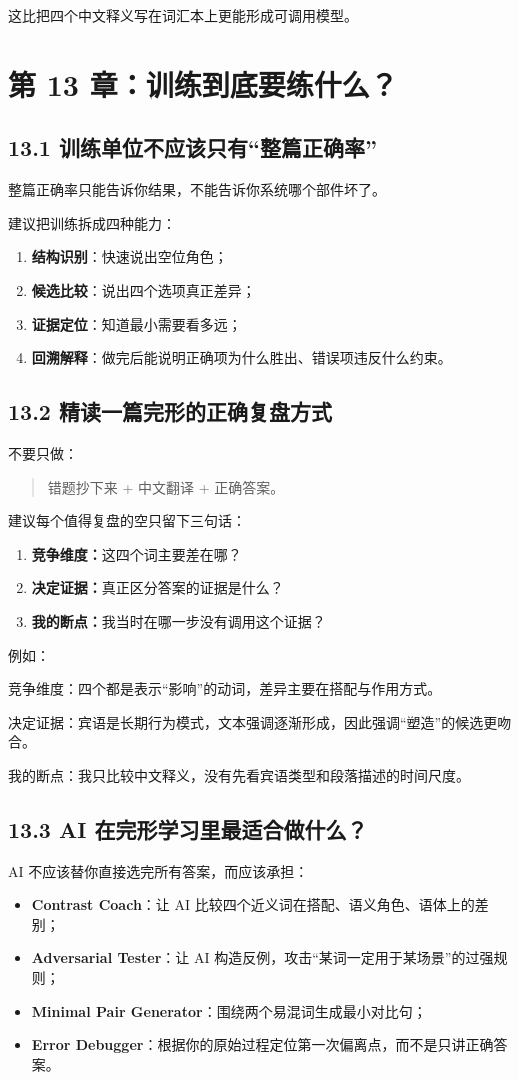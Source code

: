 \documentclass[11pt,a4paper]{ctexart}
\newcommand{\kw}[1]{\textbf{#1}}
\begin{document}
这比把四个中文释义写在词汇本上更能形成可调用模型。

\section{第 13 章：训练到底要练什么？}

\subsection{13.1 训练单位不应该只有“整篇正确率”}
整篇正确率只能告诉你结果，不能告诉你系统哪个部件坏了。

建议把训练拆成四种能力：
\begin{enumerate}
  \item \kw{结构识别}：快速说出空位角色；
  \item \kw{候选比较}：说出四个选项真正差异；
  \item \kw{证据定位}：知道最小需要看多远；
  \item \kw{回溯解释}：做完后能说明正确项为什么胜出、错误项违反什么约束。
\end{enumerate}

\subsection{13.2 精读一篇完形的正确复盘方式}
不要只做：
\begin{quote}
错题抄下来 + 中文翻译 + 正确答案。
\end{quote}
建议每个值得复盘的空只留下三句话：
\begin{enumerate}
  \item \kw{竞争维度：}这四个词主要差在哪？
  \item \kw{决定证据：}真正区分答案的证据是什么？
  \item \kw{我的断点：}我当时在哪一步没有调用这个证据？
\end{enumerate}

例如：
\begin{method}[一个合格的复盘条目]
竞争维度：四个都是表示“影响”的动词，差异主要在搭配与作用方式。\par
决定证据：宾语是长期行为模式，文本强调逐渐形成，因此强调“塑造”的候选更吻合。\par
我的断点：我只比较中文释义，没有先看宾语类型和段落描述的时间尺度。
\end{method}

\subsection{13.3 AI 在完形学习里最适合做什么？}
AI 不应该替你直接选完所有答案，而应该承担：
\begin{itemize}
  \item \kw{Contrast Coach}：让 AI 比较四个近义词在搭配、语义角色、语体上的差别；
  \item \kw{Adversarial Tester}：让 AI 构造反例，攻击“某词一定用于某场景”的过强规则；
  \item \kw{Minimal Pair Generator}：围绕两个易混词生成最小对比句；
  \item \kw{Error Debugger}：根据你的原始过程定位第一次偏离点，而不是只讲正确答案。
\end{itemize}
\end{document}
